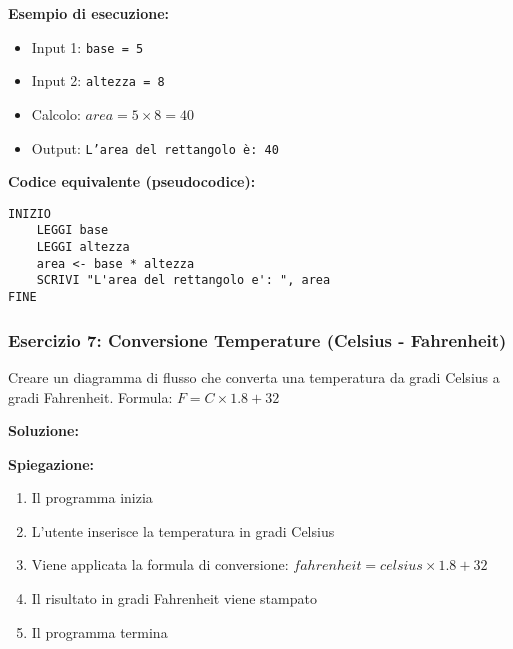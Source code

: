 \documentclass[a4paper,16pt]{article}
\begin{document}
\textbf{Esempio di esecuzione:}
\begin{itemize}
    \item Input 1: \texttt{base = 5}
    \item Input 2: \texttt{altezza = 8}
    \item Calcolo: $area = 5 \times 8 = 40$
    \item Output: \texttt{L'area del rettangolo è: 40}
\end{itemize}

\textbf{Codice equivalente (pseudocodice):}
\begin{lstlisting}
INIZIO
    LEGGI base
    LEGGI altezza
    area <- base * altezza
    SCRIVI "L'area del rettangolo e': ", area
FINE
\end{lstlisting}

\newpage
\subsubsection{Esercizio 7: Conversione Temperature (Celsius - Fahrenheit)}

\begin{tcolorbox}[colback=blue!5!white,colframe=blue!75!black,title=Traccia]
Creare un diagramma di flusso che converta una temperatura da gradi Celsius a gradi Fahrenheit. Formula: $F = C \times 1.8 + 32$
\end{tcolorbox}

\textbf{Soluzione:}

\begin{center}
\end{center}

\textbf{Spiegazione:}
\begin{enumerate}
    \item Il programma inizia
    \item L'utente inserisce la temperatura in gradi Celsius
    \item Viene applicata la formula di conversione: $fahrenheit = celsius \times 1.8 + 32$
    \item Il risultato in gradi Fahrenheit viene stampato
    \item Il programma termina
\end{enumerate}
\end{document}
